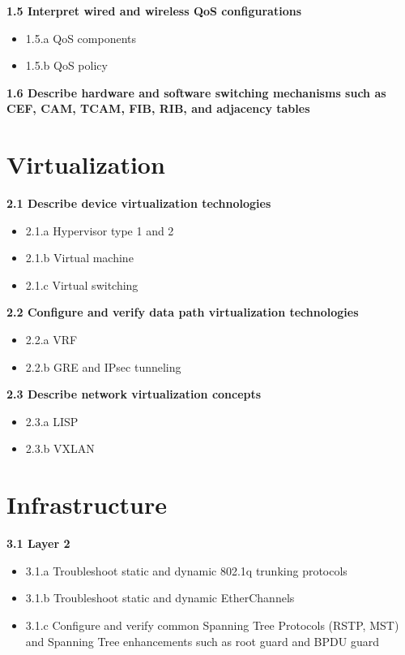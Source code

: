 \documentclass{article}
\begin{document}
\noindent\textbf{1.5 Interpret wired and wireless QoS configurations}
\begin{itemize}
\item 1.5.a QoS components
\item 1.5.b QoS policy
\end{itemize}

\noindent\textbf{1.6 Describe hardware and software switching mechanisms such as CEF, CAM, TCAM, FIB, RIB, and adjacency tables}\\

\section{Virtualization}
\textbf{2.1 Describe device virtualization technologies}
\begin{itemize}
\item 2.1.a Hypervisor type 1 and 2
\item 2.1.b Virtual machine
\item 2.1.c Virtual switching
\end{itemize}

\noindent\textbf{2.2 Configure and verify data path virtualization technologies}
\begin{itemize}
\item 2.2.a VRF
\item 2.2.b GRE and IPsec tunneling
\end{itemize}

\noindent\textbf{2.3 Describe network virtualization concepts}
\begin{itemize}
\item 2.3.a LISP
\item 2.3.b VXLAN
\end{itemize}

\section{Infrastructure}
\textbf{3.1 Layer 2}
\begin{itemize}
\item 3.1.a Troubleshoot static and dynamic 802.1q trunking protocols
\item 3.1.b Troubleshoot static and dynamic EtherChannels
\item 3.1.c Configure and verify common Spanning Tree Protocols (RSTP, MST) and Spanning Tree enhancements such as root guard and BPDU guard
\end{itemize}
\end{document}
